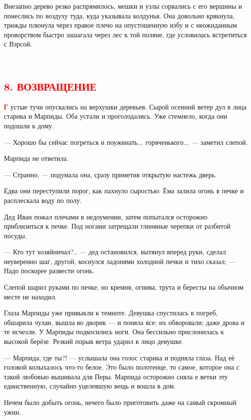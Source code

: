 \documentclass[oneside,final,14pt]{extreport}
\begin{document}
	Внезапно дерево резко распрямилось, мешки и узлы сорвались с его вершины и понеслись по воздуху туда, куда указывала колдунья. Она довольно крякнула, трижды плюнула через правое плечо на опустошенную избу и с неожиданным проворством быстро зашагала через лес к той поляне, где условилась встретиться с Вэрсой.
	
		\
	{%
		\centering
		\subsection*{\textcolor{red}{8. ВОЗВРАЩЕНИЕ}}
	}
	
\lettrine[findent=0pt]{\textbf{\textcolor{red}{Г}}}{} устые тучи опускались на верхушки деревьев. Сырой осенний ветер дул в лица старика и Марпиды. Оба устали и проголодались. Уже стемнело, когда они подошли к дому.
	
	— Хорошо бы сейчас погреться и поужинать... горяченького... — заметил слепой.
	
	Марпида не ответила.
	
	— Странно, — подумала она, сразу приметив открытую настежь дверь.
	
	Едва они переступили порог, как пахнуло сыростью: Ёма залила огонь в печке и расплескала воду по полу.
	
	Дед Иван пожал плечами в недоумении, затем попытался осторожно приблизиться к печке. Под ногами затрещали глиняные черепки от разбитой посуды.
	
	— Кто тут хозяйничал?.. — дед остановился, вытянул вперед руки, сделал неуверенно шаг, другой, коснулся ладонями холодной печки и тихо сказал; — Надо поскорее развести огонь.
	
	Слепой шарил руками по печке, но кремня, огнива, трута и бересты на обычном месте не находил.
	
	Глаза Марпиды уже привыкли к темноте. Девушка спустилась в погреб, обшарила чулан, вышла во дворик — и поняла все: их обворовали; даже дрова и те исчезли. У Марпиды подкосились ноги. Она бессильно прислонилась к высокой берёзе. Резкий порыв ветра ударил в лицо девушке.
	
	— Марпида, где ты?! — услышала она голос старика и подняла глаза. Над её головой колыхалось что-то белое. Это было полотенце, то самое, которое она с такой любовью вышивала для Перы. Марпида осторожно сняла е ветки эту единственную, случайно уцелевшую вещь и вошла в дом.
	
	Нечем было добыть огонь, нечего было приготовить даже на самый скромный ужин.
	
\end{document}
